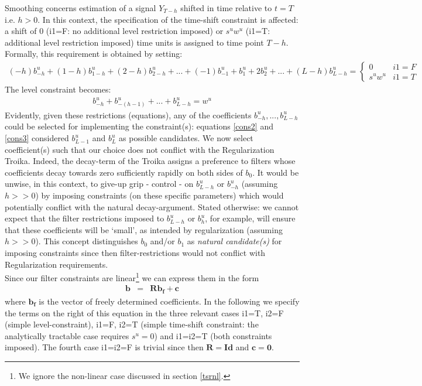 \documentclass[11pt]{article}
\begin{document}
Smoothing concerns estimation of a signal $Y_{T-h}$ shifted in time relative to $t=T$ i.e. $h>0$. In this context, the specification  of the time-shift constraint is affected: a shift of 0 (i1=F:  no additional level restriction imposed) or $s^uw^u$ (i1=T: additional level restriction imposed) time units is assigned to time point $T-h$. Formally, this requirement is obtained by setting: 
\begin{eqnarray}\label{cons11s}
(-h)b_{-h}^u+(1-h)b_{1-h}^u+(2-h)b_{2-h}^u+...+(-1)b_{-1}^u+b_{1}^u+2b_{2}^u+...+(L-h)b_{L-h}^u=\left\{\begin{array}{cc}0&i1=F\\s^uw^u&i1=T\end{array}\right.
\end{eqnarray}
The level constraint becomes:
\begin{eqnarray}\label{cons1s}
b_{-h}^u+b_{-(h-1)}^u+...+b_{L-h}^u=w^u
\end{eqnarray}
Evidently, given these restrictions (equations), any of the coefficients $b_{-h}^u,...,b_{L-h}^u$ could be selected for implementing the constraint(s): equations \ref{cons2} and \ref{cons3} considered $b_{L-1}^u$ and $b_L^u$ as possible candidates. We now select coefficient(s) such that our choice does not conflict with the Regularization Troika. Indeed, the decay-term of the Troika assigns a  preference to filters whose coefficients decay towards zero sufficiently rapidly on both sides of $b_0$. It would be unwise, in this context, to give-up grip - control - on $b_{L-h}^u$ or $b_{-h}^u$ (assuming $h>>0$) by imposing constraints (on these specific parameters) which would potentially conflict with the natural decay-argument. Stated otherwise: we cannot expect that the filter restrictions imposed to $b_{L-h}^u$ or $b_h^u$, for example, will ensure that these coefficients will be `small', as intended by regularization (assuming $h>>0$). This concept distinguishes $b_0$ and/or $b_1$ as \emph{natural candidate(s)} for imposing constraints since then filter-restrictions would not conflict with Regularization requirements. \\

Since our filter constraints are linear\footnote{We ignore the non-linear case discussed in section \ref{tsrnl}.} we can express them in the form
\begin{eqnarray}\label{cons5s}
\mathbf{b}&=&\mathbf{R b_{f}}+\mathbf{c}
\end{eqnarray}
where $\mathbf{b_f}$ is the vector of freely determined coefficients. In the following we specify the terms on the right of this equation in the three relevant cases i1=T, i2=F (simple level-constraint), i1=F, i2=T (simple time-shift constraint: the analytically tractable case requires $s^u=0$) and i1=i2=T (both constraints imposed). The fourth case i1=i2=F is trivial since then $\mathbf{R=Id}$ and $\mathbf{c=0}$.
\end{document}
